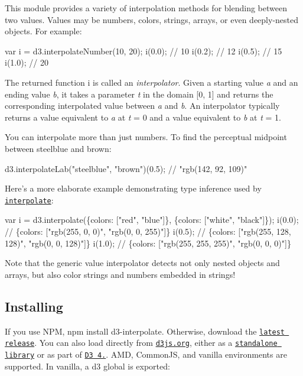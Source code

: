 This module provides a variety of interpolation methods for blending between two values. Values may be numbers, colors, strings, arrays, or even deeply-\/nested objects. For example\+:


\begin{DoxyCode}
var i = d3.interpolateNumber(10, 20);
i(0.0); // 10
i(0.2); // 12
i(0.5); // 15
i(1.0); // 20
\end{DoxyCode}


The returned function {\ttfamily i} is called an {\itshape interpolator}. Given a starting value {\itshape a} and an ending value {\itshape b}, it takes a parameter {\itshape t} in the domain \mbox{[}0, 1\mbox{]} and returns the corresponding interpolated value between {\itshape a} and {\itshape b}. An interpolator typically returns a value equivalent to {\itshape a} at {\itshape t} = 0 and a value equivalent to {\itshape b} at {\itshape t} = 1.

You can interpolate more than just numbers. To find the perceptual midpoint between steelblue and brown\+:


\begin{DoxyCode}
d3.interpolateLab("steelblue", "brown")(0.5); // "rgb(142, 92, 109)"
\end{DoxyCode}


Here’s a more elaborate example demonstrating type inference used by \href{#interpolate}{\tt interpolate}\+:


\begin{DoxyCode}
var i = d3.interpolate(\{colors: ["red", "blue"]\}, \{colors: ["white", "black"]\});
i(0.0); // \{colors: ["rgb(255, 0, 0)", "rgb(0, 0, 255)"]\}
i(0.5); // \{colors: ["rgb(255, 128, 128)", "rgb(0, 0, 128)"]\}
i(1.0); // \{colors: ["rgb(255, 255, 255)", "rgb(0, 0, 0)"]\}
\end{DoxyCode}


Note that the generic value interpolator detects not only nested objects and arrays, but also color strings and numbers embedded in strings!

\subsection*{Installing}

If you use N\+PM, {\ttfamily npm install d3-\/interpolate}. Otherwise, download the \href{https://github.com/d3/d3-interpolate/releases/latest}{\tt latest release}. You can also load directly from \href{https://d3js.org}{\tt d3js.\+org}, either as a \href{https://d3js.org/d3-interpolate.v1.min.js}{\tt standalone library} or as part of \href{https://github.com/d3/d3}{\tt D3 4.}. A\+MD, Common\+JS, and vanilla environments are supported. In vanilla, a {\ttfamily d3} global is exported\+:


